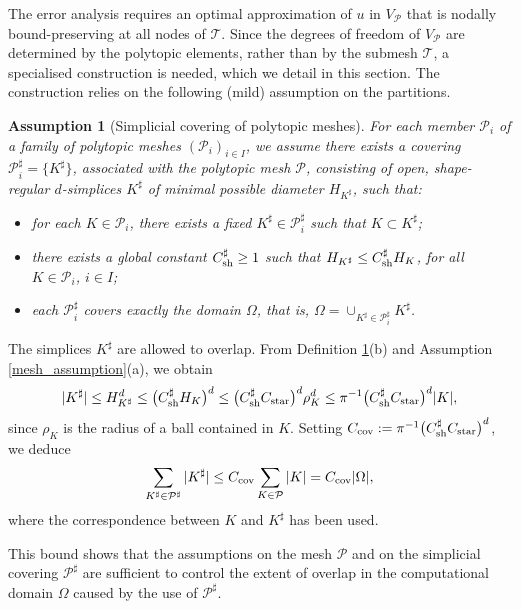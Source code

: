 \documentclass[11pt,final]{amsart}
\theoremstyle{plain}
\newtheorem{assumption}[theorem]{Assumption}
\theoremstyle{definition}
\newcommand\calP{{\mathcal{P}}}
\newcommand\calT{{\mathcal{T}}}
\newcommand{\mesh}{\calP}
\newcommand{\meshsh}{\calP^{\sharp}}
\renewcommand{\k}{K}
\newcommand{\ksh}{{K^{\sharp}}}
\begin{document}
The error analysis requires an optimal approximation of $u$ in
$V_\calP$ that is nodally bound-preserving at all nodes of
$\calT$. Since the degrees of freedom of $V_\calP$ are determined by
the polytopic elements, rather than by the submesh $\calT$, a
specialised construction is needed, which we detail in this
section. The construction relies on the following (mild) assumption on
the partitions.
    		
\begin{assumption}[Simplicial covering of polytopic meshes]
  \label{definitio36}
For each member $\mesh_i$ of a family of polytopic meshes
$(\calP_i)_{i\in I}$, we assume there exists a covering $\meshsh_i=
\{\ksh\}$, associated with the polytopic mesh $\calP$, consisting of
open, shape-regular $d$-simplices $\ksh$ of minimal possible diameter
$H_{\ksh}$, such that:
\begin{itemize}
\item[(a)] for each $\k \in\calP_i$, there exists a fixed $\ksh\in \meshsh_i$ such that $\k \subset \ksh$;
\item[(b)] there exists a global constant $C_{\rm sh}^{\sharp}\ge 1$ such that $H_{\ksh}\le C_{\rm sh}^{\sharp} H_\k$, for all $\k\in\mesh_i$, $i\in I$;
\item[(c)] each $\meshsh_i$ covers \emph{exactly} the domain $\Omega$, that is, $\Omega = \cup_{\ksh\in\meshsh_i}\ksh$.
\end{itemize}
\end{assumption}

The simplices $\ksh$ are allowed to overlap. From Definition
\ref{definitio36}(b) and Assumption \ref{mesh_assumption}(a), we
obtain
\[
|\ksh|\le H_{\ksh}^d\le \big(C_{\rm sh}^{\sharp} H_\k\big)^d\le \big(C_{\rm sh}^{\sharp} C_{\rm star}\big)^d \rho_\k^d\le \pi^{-1}\big(C_{\rm sh}^{\sharp} C_{\rm star}\big)^d |\k|,
\]
since $\rho_\k$ is the radius of a ball contained in $\k$. Setting
$C_{\rm cov}:=\pi^{-1}\big(C_{\rm sh}^{\sharp} C_{\rm star}\big)^d$,
we deduce
\begin{equation}\label{covering_bound}
 \sum_{\ksh\in\meshsh}|\ksh|\le C_{\rm cov}\sum_{\k\in\mesh}|K|=C_{\rm cov}|\Omega|,
\end{equation}
where the correspondence between $\k$ and $\ksh$ has been used.  

This bound shows that the assumptions on the mesh $\mesh$ and on the
simplicial covering $\meshsh$ are sufficient to control the extent of
overlap in the computational domain $\Omega$ caused by the use of
$\meshsh$.
	
\end{document}
